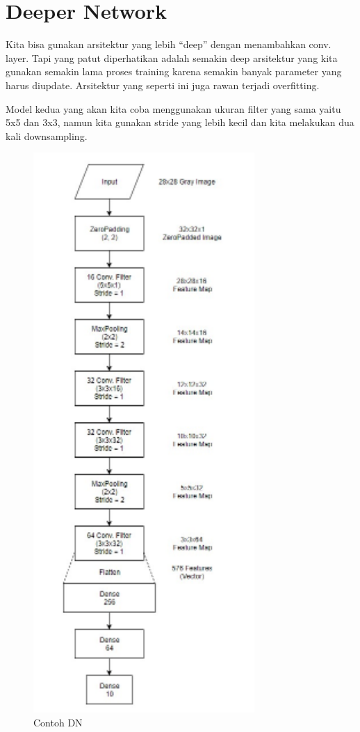 \section{Deeper Network}
Kita bisa gunakan arsitektur yang lebih “deep” dengan menambahkan conv. layer. Tapi yang patut diperhatikan adalah semakin deep arsitektur yang kita gunakan semakin lama proses training karena semakin banyak parameter yang harus diupdate. Arsitektur yang seperti ini juga rawan terjadi overfitting.

Model kedua yang akan kita coba menggunakan ukuran filter yang sama yaitu 5x5 dan 3x3, namun kita gunakan stride yang lebih kecil dan kita melakukan dua kali downsampling.
\begin{figure}[!htp]
	\includegraphics[width=0.75\textwidth]{figures/DeeperNetwork.PNG}
	\caption{Contoh DN}
	\label{labelgambar5}
\end{figure}

